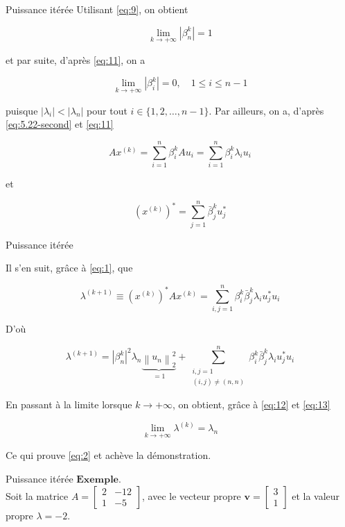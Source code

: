 \documentclass[french, 10pt]{beamer}
\theoremstyle{definition}
\begin{document}
\begin{frame}{Puissance itérée}
		Utilisant \eqref{eq:9}, on obtient
		
\begin{equation}
    		\lim _{k \rightarrow+\infty}\left|\beta_n^k\right|=1
            \label{eq:12}
\end{equation}
		
		et par suite, d'après \eqref{eq:11}, on a
		
\begin{equation}
    		\lim _{k \rightarrow+\infty}\left|\beta_i^k\right|=0, \quad 1 \leq i \leq n-1
            \label{eq:13}
\end{equation}
		
		puisque $\left|\lambda_i\right|<\left|\lambda_n\right|$ pour tout $i \in\{1,2, \ldots, n-1\}$.
		Par ailleurs, on a, d'après \eqref{eq:5.22-second} et \eqref{eq:11}
		
		$$
		A x^{(k)}=\sum_{i=1}^n \beta_i^k A u_i=\sum_{i=1}^n \beta_i^k \lambda_i u_i
		$$
		
		et
		
		$$
		\left(x^{(k)}\right)^*=\sum_{j=1}^n \bar{\beta}_j^k u_j^*
		$$
		
	
\end{frame}
\begin{frame}{Puissance itérée}
	
		Il s'en suit, grâce à \eqref{eq:1}, que
		
		$$
		\lambda^{(k+1)} \equiv\left(x^{(k)}\right)^* A x^{(k)}=\sum_{i, j=1}^n \beta_i^k \bar{\beta}_j^k \lambda_i u_j^* u_i
		$$
        		
		D'où
		
\begin{equation}
    \lambda^{(k+1)}=\left|\beta_n^k\right|^2 \lambda_n \underbrace{\left\|u_n\right\|_2^2}_{=1}+\sum_{\substack{i, j=1 \\(i, j) \neq(n, n)}}^n \beta_i^k \bar{\beta}_j^k \lambda_i u_j^* u_i
    \label{eq:14}
\end{equation}
		
		
		En passant à la limite lorsque $k \rightarrow+\infty$, on obtient, grâce à \eqref{eq:12} et \eqref{eq:13}
		
		$$
		\lim _{k \rightarrow+\infty} \lambda^{(k)}=\lambda_n
		$$
		
		
		Ce qui prouve \eqref{eq:2} et achève la démonstration.
		
\end{frame}
\begin{frame}{Puissance itérée}
    \( \boldsymbol{Exemple} \).\\
  Soit la matrice \( A = \begin{bmatrix} 2 & -12 \\ 1 & -5 \end{bmatrix} \), avec le vecteur propre \( \mathbf{v} = \begin{bmatrix} 3 \\ 1 \end{bmatrix} \) et la valeur propre \( \lambda = -2 \).
    

  
\end{frame}
\end{document}
